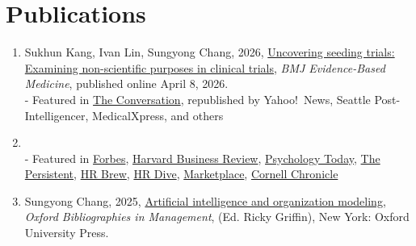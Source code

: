 \documentclass[11pt]{article}
\newenvironment{pubs}
  {\begin{enumerate}[label={(\arabic*)},leftmargin=1.9em,labelsep=0.5em,
     align=left,itemsep=5pt,topsep=3pt]}
  {\end{enumerate}}
\begin{document}
\section{Publications}
\begin{pubs}
\item Sukhun Kang, Ivan Lin, Sungyong Chang, 2026, \href{https://doi.org/10.1136/bmjebm-2025-114242}{Uncovering seeding trials: Examining non-scientific purposes in clinical trials}, \textit{BMJ Evidence-Based Medicine}, published online April 8, 2026.\\
{\color{softgray}\footnotesize - Featured in \href{https://theconversation.com/clinical-trials-that-are-actually-marketing-ploys-targeting-doctors-how-seeding-trials-put-profit-over-patients-280398}{The Conversation}, republished by Yahoo!\ News, Seattle Post-Intelligencer, MedicalXpress, and others}
\item {}\\
{\color{softgray}\footnotesize - Featured in \href{https://www.forbes.com/sites/carolinefairchild/2026/03/09/women-arent-bad-negotiators-the-system-is-working-against-them/}{Forbes}, \href{https://hbr.org/2026/02/posting-a-wide-salary-range-can-deter-women-from-applying}{Harvard Business Review}, \href{https://www.psychologytoday.com/us/blog/evidence-based-living/202609/when-transparent-pay-isnt-transparent-enough}{Psychology Today}, \href{https://www.thepersistent.com/these-laws-were-intended-to-help-correct-the-pay-gap-but-theyre-backfiring/}{The Persistent}, \href{https://www.hr-brew.com/stories/2026/03/23/broad-pay-ranges-affect-female-talent}{HR Brew}, \href{https://www.hrdive.com/news/wide-pay-band-women-workers/813968/}{HR Dive}, \href{https://www.marketplace.org/story/2026/03/19/how-effective-are-pay-transparency-laws-in-closing-the-wage-gap}{Marketplace}, \href{https://news.cornell.edu/stories/2026/03/job-listings-wide-pay-ranges-may-deter-female-applicants}{Cornell Chronicle}}
\item Sungyong Chang, 2025, \href{https://www.oxfordbibliographies.com/display/document/obo-9780199846740/obo-9780199846740-0238.xml?rskey=afgonp&result=1&q=Artificial+Intelligence+and+Organization+Modeling#firstMatch}{Artificial intelligence and organization modeling}, \textit{Oxford Bibliographies in Management}, (Ed. Ricky Griffin), New York: Oxford University Press.

\end{pubs}
\end{document}
